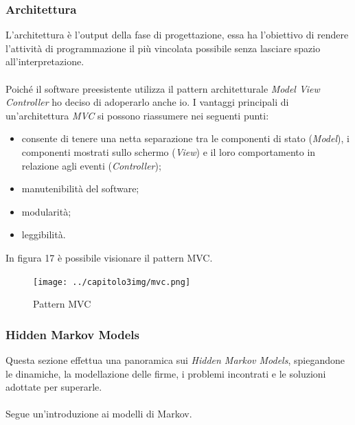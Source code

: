 \subsubsection{Architettura}
\label{3.3.1}
L'architettura è l'output della fase di progettazione, essa ha l'obiettivo di rendere l'attività di programmazione il più vincolata possibile senza lasciare spazio all'interpretazione.\\\\
Poiché il software preesistente utilizza il pattern architetturale \emph{Model View Controller} ho deciso di adoperarlo anche io. I vantaggi principali di un'architettura \emph{MVC} si possono riassumere nei seguenti punti:
\begin{itemize}
\item consente di tenere una netta separazione tra le componenti di stato (\emph{Model}), i componenti mostrati sullo schermo (\emph{View}) e
il loro comportamento in relazione agli eventi (\emph{Controller});
\item manutenibilità del software;
\item modularità;
\item leggibilità.
\end{itemize}
In figura 17 è possibile visionare il pattern MVC.
\begin{figure}[H]
\centering
\texttt{[image: ../capitolo3img/mvc.png]}
\caption{Pattern MVC}
\end{figure}
\subsubsection{Hidden Markov Models}
\label{3.3.2}
Questa sezione effettua una panoramica sui \emph{Hidden Markov Models}, spiegandone le dinamiche, la modellazione delle firme, i problemi incontrati e le soluzioni adottate per superarle.\\\\
Segue un'introduzione ai modelli di Markov.
